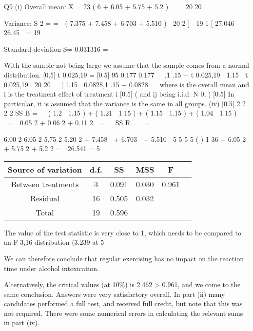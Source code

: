 \documentclass[a4paper,12pt]{article}
\begin{document}
Q9
(i)
Overall mean: X \;=
23
( 6 + 6.05 + 5.75 + 5.2 ) \;=\; \;=
20
20

Variance:
S 2 \;=\;
\;= 
( 7.375 + 7.458 + 6.703 + 5.510 )  20  2 \right]

19
1
[ 27.046  26.45  \;=
19

Standard deviation
S= 0.031316 \;=

With the sample not being large we assume that the sample comes from a
normal distribution.
[0.5]
t 0.025,19 \;=
[0.5]
95%
0.177
0.177 

,1 .15 + t 0.025,19
 1.15  t 0.025,19

20
20 

[ 1.15  0.0828,1 .15 + 0.0828  \;=\; [ 1.067, 1 .233 
Page 8
Subject CT3 %
(ii) The confidence interval in part (i) does not contain 0.9. Therefore, there is a
significant difference between the reaction time under alcohol intoxication and
0.9.

(iii) Y ij \;=\; \mu + \tau i + \varepsilon ij
[0.5]
where \mu is the overall mean and \tau i is the treatment effect of treatment i [0.5]
(
and \varepsilon ij being i.i.d. N 0, 
)
[0.5]
In particular, it is assumed that the variance is the same in all groups.
(iv)
[0.5]
2
2
2
2
SS B \;= \times   ( 1.2  1.15 ) + ( 1.21  1.15 ) + ( 1.15  1.15 ) + ( 1.04  1.15 )  


\;= \times  0.05 2 + 0.06 2 + 0.11 2  \;=


SS R \;= 
\;= 

6.00 2
6.05 2
5.75 2
5.20 2
+ 7.458 
+ 6.703 
+ 5.510 
5
5
5
5
(
)
1
36 + 6.05 2 + 5.75 2 + 5.2 2 \;=  26.541 \;=
5



\begin{center}
\begin{tabular}{|c|c|c|c|c|c|}
Source of variation	&	d.f. 	&	SS 	&	MSS	& F \\  \hline 
Between treatments	&	3 & 0.091 	& 0.030 & 	0.961 & \\ \hline 
Residual	&	16 & 	0.505 & 	0.032 & & \\ \hline

Total 	&	19	&	0.596	&		& \\ \hline 
\end{tabular}
\end{center}

The value of the test statistic is very close to 1, which needs to be compared to
an F 3,16 distribution (3.239 at 5%

We can therefore conclude that regular exercising has no impact on the reaction time under alcohol intoxication.

Alternatively, the critical values (at 10\%) is 2.462 > 0.961, and we come to the same conclusion.
Answers were very satisfactory overall. In part (ii) many candidates performed a full test, and received full credit, but note that this was not required. There were some numerical errors in calculating the
relevant sums in part (iv).
\end{document}
